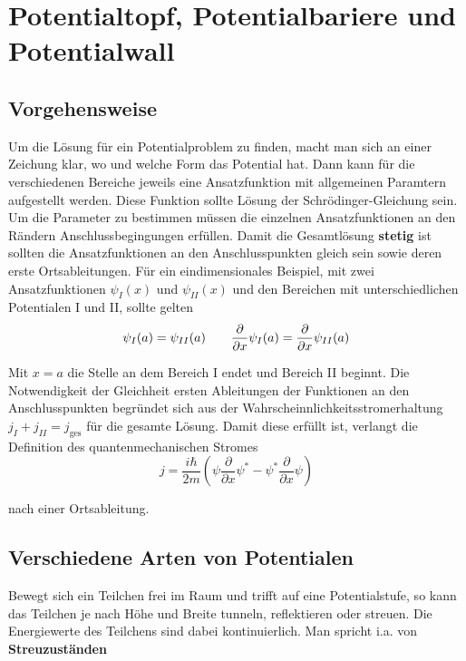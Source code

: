 
\graphicspath{{sgl_potential_pics/}}%


\setcounter{section}{1}
\section*{Potentialtopf, Potentialbariere und Potentialwall}

\subsection*{Vorgehensweise}

Um die Lösung für ein Potentialproblem zu finden, macht man sich an einer Zeichung klar, wo und welche Form das Potential hat. Dann kann für die verschiedenen Bereiche jeweils eine Ansatzfunktion mit allgemeinen Paramtern aufgestellt werden. Diese Funktion sollte Lösung der Schrödinger-Gleichung sein. Um die Parameter zu bestimmen müssen die einzelnen Ansatzfunktionen an den Rändern Anschlussbegingungen erfüllen. Damit die Gesamtlösung \textbf{stetig} ist sollten die Ansatzfunktionen an den Anschlusspunkten gleich sein sowie deren erste Ortsableitungen. Für ein eindimensionales Beispiel, mit zwei Ansatzfunktionen \(\psi_I(x)\) und \(\psi_{II}(x)\) und den Bereichen mit unterschiedlichen Potentialen I und II, sollte gelten
\begin{equation}
  \label{eq:15}
  \psi_I(a) = \psi_{II}(a)\qquad  \pdiff_x \psi_I(a) = \pdiff_x \psi_{II}(a)
\end{equation}

Mit \(x=a\) die Stelle an dem Bereich I endet und Bereich II beginnt. Die Notwendigkeit der Gleichheit ersten Ableitungen der Funktionen an den Anschlusspunkten begründet sich aus der Wahrscheinnlichkeitsstromerhaltung \(j_I+j_{II}=j_{\text{ges}}\) für die gesamte Lösung. Damit diese erfüllt ist, verlangt die Definition des quantenmechanischen Stromes
\begin{equation}
  \label{eq:17}
  j = \frac{i\hbar}{2m}\left(\psi \frac{\partial}{\partial x} \psi^* - \psi^* \frac{\partial}{\partial x}\psi\right)
\end{equation}

nach einer Ortsableitung.

\subsection*{Verschiedene Arten von Potentialen}

Bewegt sich ein Teilchen frei im Raum und trifft auf eine Potentialstufe, so kann das Teilchen je nach Höhe und Breite tunneln, reflektieren oder streuen. Die Energiewerte des Teilchens sind dabei kontinuierlich. Man spricht i.a. von \textbf{Streuzuständen}

